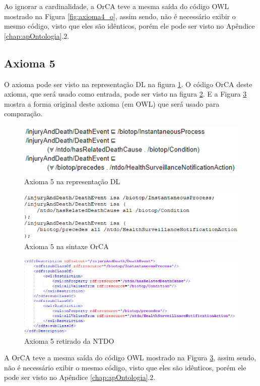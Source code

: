 \documentclass{bcc}
\begin{document}
Ao ignorar a cardinalidade, a OrCA teve a mesma saída do código OWL mostrado na Figura \ref{fig:axioma4_o}, assim sendo, não é necessário exibir o mesmo código, visto que eles são idênticos, porém ele pode ser visto no Apêndice \ref{chap:apOntologia}.2.

\subsection{Axioma 5}
O axioma pode ser visto na representação DL na figura \ref{fig:axioma5_dl}. O código OrCA deste axioma, que será usado como entrada, pode ser visto na figura \ref{fig:axioma5_orca}. E a Figura \ref{fig:axioma5_o} mostra a forma original deste axioma (em OWL) que será usado para comparação. 

\begin{figure}[H]
\centering
\includegraphics[width=.6\textwidth]{Figuras/axioma5_dl.png}
\caption{Axioma 5 na representação DL} 
\label{fig:axioma5_dl}
\end{figure}

\begin{figure}[H]
\centering
\includegraphics[width=.7\textwidth]{Figuras/axioma5_orca.png}
\caption{Axioma 5 na sintaxe OrCA} 
\label{fig:axioma5_orca}
\end{figure}

\begin{figure}[H]
\centering
\includegraphics[width=.8\textwidth]{Figuras/axioma5_o.png}
\caption{Axioma 5 retirado da NTDO} 
\label{fig:axioma5_o}
\end{figure}

A OrCA teve a mesma saída do código OWL mostrado na Figura \ref{fig:axioma5_o}, assim sendo, não é necessário exibir o mesmo código, visto que eles são idênticos, porém ele pode ser visto no Apêndice \ref{chap:apOntologia}.2.
\end{document}
